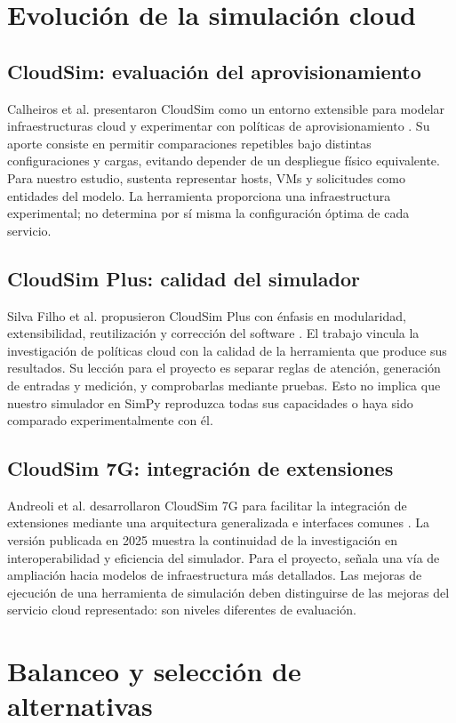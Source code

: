 \documentclass[conference,a4paper]{IEEEtran}
\begin{document}
\section{Evolución de la simulación cloud}
\subsection{CloudSim: evaluación del aprovisionamiento}
Calheiros et al. presentaron CloudSim como un entorno extensible para modelar infraestructuras cloud y experimentar con políticas de aprovisionamiento \cite{cloudsim}. Su aporte consiste en permitir comparaciones repetibles bajo distintas configuraciones y cargas, evitando depender de un despliegue físico equivalente. Para nuestro estudio, sustenta representar hosts, VMs y solicitudes como entidades del modelo. La herramienta proporciona una infraestructura experimental; no determina por sí misma la configuración óptima de cada servicio.

\subsection{CloudSim Plus: calidad del simulador}
Silva Filho et al. propusieron CloudSim Plus con énfasis en modularidad, extensibilidad, reutilización y corrección del software \cite{plus}. El trabajo vincula la investigación de políticas cloud con la calidad de la herramienta que produce sus resultados. Su lección para el proyecto es separar reglas de atención, generación de entradas y medición, y comprobarlas mediante pruebas. Esto no implica que nuestro simulador en SimPy reproduzca todas sus capacidades o haya sido comparado experimentalmente con él.

\subsection{CloudSim 7G: integración de extensiones}
Andreoli et al. desarrollaron CloudSim 7G para facilitar la integración de extensiones mediante una arquitectura generalizada e interfaces comunes \cite{seven}. La versión publicada en 2025 muestra la continuidad de la investigación en interoperabilidad y eficiencia del simulador. Para el proyecto, señala una vía de ampliación hacia modelos de infraestructura más detallados. Las mejoras de ejecución de una herramienta de simulación deben distinguirse de las mejoras del servicio cloud representado: son niveles diferentes de evaluación.

\section{Balanceo y selección de alternativas}
\end{document}

